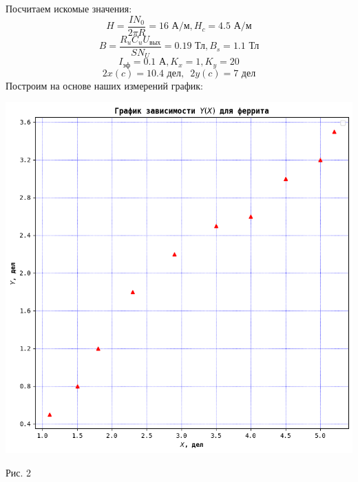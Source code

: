 \documentclass[a4paper, 12pt]{article}
\begin{document}
Посчитаем искомые значения:
$$H = \frac{I N_0}{2 \pi R} = 16 \text{ А/м}, H_c = 4.5 \text { А/м}$$
$$B = \frac{R_u C_u U_\text{вых}}{S N_U} = 0.19 \text{ Тл}, B_s = 1.1 \text{ Тл}$$
$$I_\text{эф} = 0.1 \text{ А}, K_x = 1, K_y = 20$$
$$2x(c) = 10.4 \text{ дел}, \phantom 22y(c) = 7 \text{ дел}$$
Построим на основе наших измерений график: 
\begin{center}
    \includegraphics[width=0.5\linewidth]{Ferrit_graphic.png}
    \caption{Рис. 2}
    \label{fig:enter-label}
\end{center}
\end{document}
